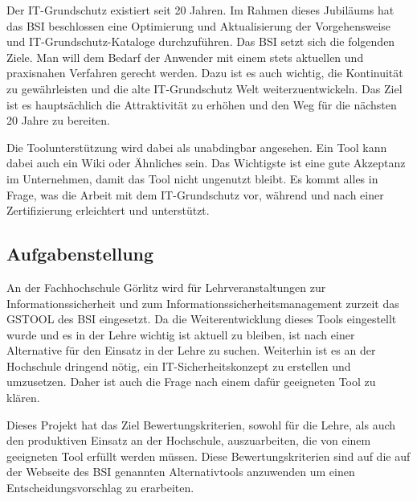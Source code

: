Der IT-Grundschutz existiert seit 20 Jahren. Im Rahmen dieses Jubiläums hat das BSI beschlossen eine Optimierung und Aktualisierung der Vorgehensweise und IT-Grundschutz-Kataloge durchzuführen\cite{bsi}. Das BSI setzt sich die folgenden Ziele. Man will dem Bedarf der Anwender mit einem stets aktuellen und praxisnahen Verfahren gerecht werden. Dazu ist es auch wichtig, die Kontinuität zu gewährleisten und die alte IT-Grundschutz Welt weiterzuentwickeln. Das Ziel ist es hauptsächlich die Attraktivität zu erhöhen und den Weg für die nächsten 20 Jahre zu bereiten.

Die Toolunterstützung wird dabei als unabdingbar angesehen. Ein Tool kann dabei auch ein Wiki oder Ähnliches sein. Das Wichtigste ist eine gute Akzeptanz im Unternehmen, damit das Tool nicht ungenutzt bleibt. Es kommt alles in Frage, was die Arbeit mit dem IT-Grundschutz vor, während und nach einer Zertifizierung erleichtert und unterstützt.

\subsection{Aufgabenstellung}
An der Fachhochschule Görlitz wird für Lehrveranstaltungen zur Informationssicherheit und zum
Informationssicherheitsmanagement zurzeit das GSTOOL des BSI eingesetzt. Da die Weiterentwicklung dieses Tools eingestellt wurde und es in der Lehre wichtig ist aktuell zu bleiben, ist nach einer Alternative für den Einsatz in der Lehre zu suchen. 
Weiterhin ist es an der Hochschule dringend nötig, ein IT-Sicherheitskonzept zu erstellen und umzusetzen. Daher ist auch die Frage nach einem dafür geeigneten Tool zu klären. 

Dieses Projekt hat das Ziel Bewertungskriterien, sowohl für die Lehre, als auch den produktiven Einsatz an der Hochschule, auszuarbeiten, die von einem geeigneten Tool erfüllt werden müssen. Diese Bewertungskriterien sind auf die auf der Webseite des BSI genannten Alternativtools anzuwenden um einen Entscheidungsvorschlag zu erarbeiten.